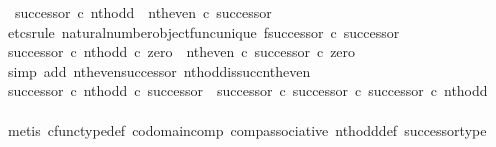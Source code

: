 \begin{isabellebody}
\ \ {\isachardoublequoteopen}successor\ {\isasymcirc}\isactrlsub c\ nth{\isacharunderscore}{\kern0pt}odd\ {\isacharequal}{\kern0pt}\ nth{\isacharunderscore}{\kern0pt}even\ {\isasymcirc}\isactrlsub c\ successor{\isachardoublequoteclose}\isanewline
%
\isadelimproof
%
\endisadelimproof
%
\isatagproof
{}\isamarkupfalse%
\ {\isacharparenleft}{\kern0pt}etcs{\isacharunderscore}{\kern0pt}rule\ natural{\isacharunderscore}{\kern0pt}number{\isacharunderscore}{\kern0pt}object{\isacharunderscore}{\kern0pt}func{\isacharunderscore}{\kern0pt}unique{\isacharbrackleft}{\kern0pt}\ f{\isacharequal}{\kern0pt}{\isachardoublequoteopen}successor\ {\isasymcirc}\isactrlsub c\ successor{\isachardoublequoteclose}{\isacharbrackright}{\kern0pt}{\isacharparenright}{\kern0pt}\isanewline
\ \ \isamarkupfalse%
\ {\isachardoublequoteopen}{\isacharparenleft}{\kern0pt}successor\ {\isasymcirc}\isactrlsub c\ nth{\isacharunderscore}{\kern0pt}odd{\isacharparenright}{\kern0pt}\ {\isasymcirc}\isactrlsub c\ zero\ {\isacharequal}{\kern0pt}\ {\isacharparenleft}{\kern0pt}nth{\isacharunderscore}{\kern0pt}even\ {\isasymcirc}\isactrlsub c\ successor{\isacharparenright}{\kern0pt}\ {\isasymcirc}\isactrlsub c\ zero{\isachardoublequoteclose}\isanewline
\ \ \ \ \isamarkupfalse%
\ {\isacharparenleft}{\kern0pt}simp\ add{\isacharcolon}{\kern0pt}\ nth{\isacharunderscore}{\kern0pt}even{\isacharunderscore}{\kern0pt}successor{}\ nth{\isacharunderscore}{\kern0pt}odd{\isacharunderscore}{\kern0pt}is{\isacharunderscore}{\kern0pt}succ{\isacharunderscore}{\kern0pt}nth{\isacharunderscore}{\kern0pt}even{\isacharparenright}{\kern0pt}\isanewline
\ \ \isamarkupfalse%
\ {\isachardoublequoteopen}{\isacharparenleft}{\kern0pt}successor\ {\isasymcirc}\isactrlsub c\ nth{\isacharunderscore}{\kern0pt}odd{\isacharparenright}{\kern0pt}\ {\isasymcirc}\isactrlsub c\ successor\ {\isacharequal}{\kern0pt}\ {\isacharparenleft}{\kern0pt}successor\ {\isasymcirc}\isactrlsub c\ successor{\isacharparenright}{\kern0pt}\ {\isasymcirc}\isactrlsub c\ successor\ {\isasymcirc}\isactrlsub c\ nth{\isacharunderscore}{\kern0pt}odd{\isachardoublequoteclose}\isanewline
\ \ \ \ \isamarkupfalse%
\ {\isacharparenleft}{\kern0pt}metis\ cfunc{\isacharunderscore}{\kern0pt}type{\isacharunderscore}{\kern0pt}def\ codomain{\isacharunderscore}{\kern0pt}comp\ comp{\isacharunderscore}{\kern0pt}associative\ nth{\isacharunderscore}{\kern0pt}odd{\isacharunderscore}{\kern0pt}def{}\ successor{\isacharunderscore}{\kern0pt}type{\isacharparenright}{\kern0pt}\isanewline

\end{isabellebody}
